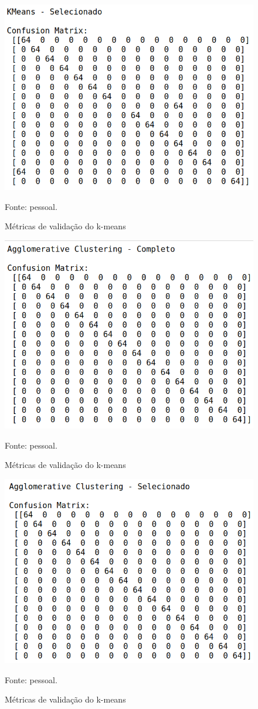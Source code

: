 \begin{figure}[h]
	\centering
	\includegraphics[width=0.7\linewidth]{images/dim128_result_kmeans_selecionado}
	\caption{Métricas de validação do k-means}
	Fonte: pessoal.
	\label{fig:dim128_result_kmeans_selecionado}
\end{figure}

\begin{figure}[h]
	\centering
	\includegraphics[width=0.7\linewidth]{images/dim128_result_agglomerative_completo}
	\caption{Métricas de validação do k-means}
	Fonte: pessoal.
	\label{fig:dim128_result_agglomerative_completo}
\end{figure}

\begin{figure}[h]
	\centering
	\includegraphics[width=0.7\linewidth]{images/dim128_result_agglomerative_selecionado}
	\caption{Métricas de validação do k-means}
	Fonte: pessoal.
	\label{fig:dim128_result_agglomerative_selecionado}
\end{figure}

